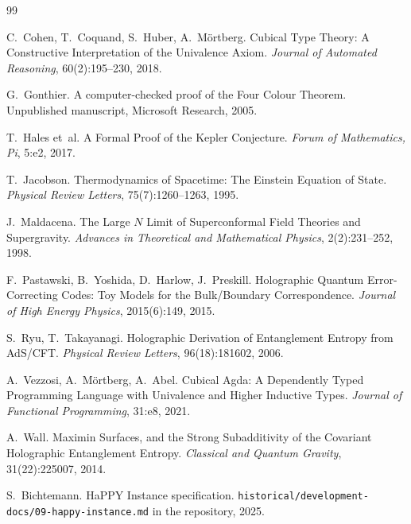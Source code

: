\documentclass[11pt,a4paper]{article}
\begin{document}
\begin{thebibliography}{99}

C.~Cohen, T.~Coquand, S.~Huber, A.~M\"ortberg.
\newblock Cubical Type Theory: A Constructive Interpretation of the
  Univalence Axiom.
\newblock \emph{Journal of Automated Reasoning}, 60(2):195--230, 2018.

G.~Gonthier.
\newblock A computer-checked proof of the Four Colour Theorem.
\newblock Unpublished manuscript, Microsoft Research, 2005.

T.~Hales et~al.
\newblock A Formal Proof of the Kepler Conjecture.
\newblock \emph{Forum of Mathematics, Pi}, 5:e2, 2017.

T.~Jacobson.
\newblock Thermodynamics of Spacetime: The Einstein Equation of State.
\newblock \emph{Physical Review Letters}, 75(7):1260--1263, 1995.

J.~Maldacena.
\newblock The Large $N$ Limit of Superconformal Field Theories and
  Supergravity.
\newblock \emph{Advances in Theoretical and Mathematical Physics},
  2(2):231--252, 1998.

F.~Pastawski, B.~Yoshida, D.~Harlow, J.~Preskill.
\newblock Holographic Quantum Error-Correcting Codes: Toy Models for
  the Bulk/Boundary Correspondence.
\newblock \emph{Journal of High Energy Physics}, 2015(6):149, 2015.

S.~Ryu, T.~Takayanagi.
\newblock Holographic Derivation of Entanglement Entropy from AdS/CFT.
\newblock \emph{Physical Review Letters}, 96(18):181602, 2006.

A.~Vezzosi, A.~M\"ortberg, A.~Abel.
\newblock Cubical Agda: A Dependently Typed Programming Language with
  Univalence and Higher Inductive Types.
\newblock \emph{Journal of Functional Programming}, 31:e8, 2021.

A.~Wall.
\newblock Maximin Surfaces, and the Strong Subadditivity of the
  Covariant Holographic Entanglement Entropy.
\newblock \emph{Classical and Quantum Gravity}, 31(22):225007, 2014.

S.~Bichtemann.
\newblock HaPPY Instance specification.
\newblock \texttt{historical/development-docs/09-happy-instance.md}
  in the repository, 2025.

\end{thebibliography}
\end{document}
